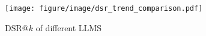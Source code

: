 \begin{figure}[h!]
    \centering
    \texttt{[image: figure/image/dsr\_trend\_comparison.pdf]}
    \caption{$\text{DSR}@k$ of different LLMS}
    \label{fig:assVSrole}
    \vspace{-0.2cm}
\end{figure}
